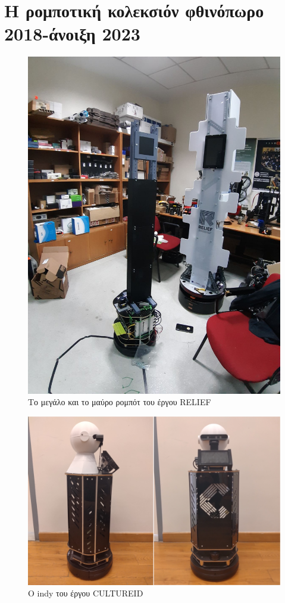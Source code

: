 \section{Η ρομποτική κολεκσιόν φθινόπωρο 2018-άνοιξη 2023}
\begin{figure}[H]\centering
  \includegraphics[scale=0.25]{./figures/parts/appendix/chapters/06/relief_robots.jpg}
  \caption{\small Το μεγάλο και το μαύρο ρομπότ του έργου RELIEF}
\end{figure}
\begin{figure}[H]\centering
  \includegraphics[scale=0.2]{./figures/parts/appendix/chapters/06/indy.png}
  \caption{\small Ο indy του έργου CULTUREID}
\end{figure}
